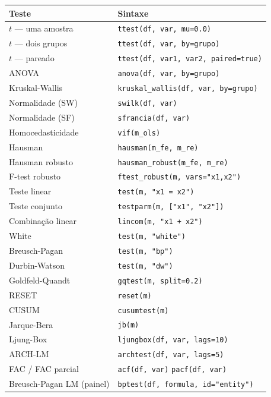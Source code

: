 \begin{center}
\begin{tabular}{ll}
\toprule
\textbf{Teste} & \textbf{Sintaxe} \\
\midrule
$t$ — uma amostra   & \texttt{ttest(df, var, mu=0.0)} \\
$t$ — dois grupos   & \texttt{ttest(df, var, by=grupo)} \\
$t$ — pareado       & \texttt{ttest(df, var1, var2, paired=true)} \\
ANOVA               & \texttt{anova(df, var, by=grupo)} \\
Kruskal-Wallis      & \texttt{kruskal\_wallis(df, var, by=grupo)} \\
\midrule
Normalidade (SW)    & \texttt{swilk(df, var)} \\
Normalidade (SF)    & \texttt{sfrancia(df, var)} \\
Homocedasticidade   & \texttt{vif(m\_ols)} \\
Hausman             & \texttt{hausman(m\_fe, m\_re)} \\
Hausman robusto     & \texttt{hausman\_robust(m\_fe, m\_re)} \\
F-test robusto      & \texttt{ftest\_robust(m, vars="x1,x2")} \\
Teste linear        & \texttt{test(m, "x1 = x2")} \\
Teste conjunto      & \texttt{testparm(m, ["x1", "x2"])} \\
Combinação linear   & \texttt{lincom(m, "x1 + x2")} \\
White               & \texttt{test(m, "white")} \\
Breusch-Pagan       & \texttt{test(m, "bp")} \\
Durbin-Watson       & \texttt{test(m, "dw")} \\
Goldfeld-Quandt     & \texttt{gqtest(m, split=0.2)} \\
RESET               & \texttt{reset(m)} \\
CUSUM               & \texttt{cusumtest(m)} \\
Jarque-Bera         & \texttt{jb(m)} \\
Ljung-Box           & \texttt{ljungbox(df, var, lags=10)} \\
ARCH-LM             & \texttt{archtest(df, var, lags=5)} \\
FAC / FAC parcial   & \texttt{acf(df, var)} \quad \texttt{pacf(df, var)} \\
Breusch-Pagan LM (painel) & \texttt{bptest(df, formula, id="entity")} \\

\end{tabular}
\end{center}
